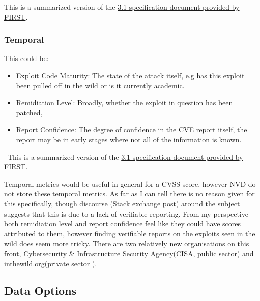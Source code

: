 \documentclass[12pt]{article}
\begin{document}
\footnotesize{This is a summarized version of the
	\href{https://www.first.org/cvss/v3.1/specification-document}{3.1 specification document
		provided by FIRST}. \cite{CVSS_31}}


\subsubsection*{Temporal}


\bigskip

This could be:
\begin{itemize}

	\item Exploit Code Maturity: The state of the attack itself, e.g has this exploit been pulled
	      off in the wild or is it currently academic.

	\item Remidiation Level: Broadly, whether the exploit in question has been patched,

	\item Report Confidence: The degree of confidence in the CVE report itself, the report may be in
	      early stages where not all of the information is known.

\end{itemize}
\
\footnotesize{This is a summarized version of the
	\href{https://www.first.org/cvss/v3.1/specification-document}{3.1 specification document
		provided by FIRST}. \cite{CVSS_31}} \\
\bigskip

Temporal metrics would be useful in general for a CVSS score, however NVD do not store these
temporal metrics. As far as I can tell there is no reason given for this specifically, though
discourse
\href{https://security.stackexchange.com/questions/270257/cvss-v3-and-v3-1-missing-temporal-metrics-exploit-code-maturity-and-remediation
}{(Stack exchange post)} \cite{stack_exchange} around the subject suggests that this is due to a lack
of verifiable reporting. From my perspective both remidiation level and report confidence feel like
they could have scores attributed to them, however finding verifiable reports on the exploits seen
in the wild does seem more tricky. There are two relatively new organisations on this front,
Cybersecurity \& Infrastructure Security Agency(CISA,
\href{https://www.cisa.gov/known-exploited-vulnerabilities-catalog}{public sector}) and
inthewild.org(\href{https://inthewild.io/}{private sector} \cite{cisa}).

\subsection{Data Options}
\end{document}

